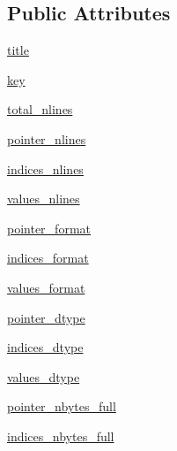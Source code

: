 \subsection*{Public Attributes}
\begin{DoxyCompactItemize}
\item 
\hyperlink{classscipy_1_1io_1_1harwell__boeing_1_1hb_1_1HBInfo_ac4aee9c85927ca22614e9a5fbab57615}{title}
\item 
\hyperlink{classscipy_1_1io_1_1harwell__boeing_1_1hb_1_1HBInfo_a5f0761b1508a3e658dfb482a5ecc8f2f}{key}
\item 
\hyperlink{classscipy_1_1io_1_1harwell__boeing_1_1hb_1_1HBInfo_a04af3e785630b81c4511e79d977cb64b}{total\+\_\+nlines}
\item 
\hyperlink{classscipy_1_1io_1_1harwell__boeing_1_1hb_1_1HBInfo_a64bdde52eda87746f758a6aaf87389a7}{pointer\+\_\+nlines}
\item 
\hyperlink{classscipy_1_1io_1_1harwell__boeing_1_1hb_1_1HBInfo_a315563a48cedcd5b796690ad426f170d}{indices\+\_\+nlines}
\item 
\hyperlink{classscipy_1_1io_1_1harwell__boeing_1_1hb_1_1HBInfo_af510f09accb2dedcf6c03a7ae16407fb}{values\+\_\+nlines}
\item 
\hyperlink{classscipy_1_1io_1_1harwell__boeing_1_1hb_1_1HBInfo_afc0d2a740477fc6a2dbd330000258288}{pointer\+\_\+format}
\item 
\hyperlink{classscipy_1_1io_1_1harwell__boeing_1_1hb_1_1HBInfo_a60781fff326c6c5068afd8fab54f2844}{indices\+\_\+format}
\item 
\hyperlink{classscipy_1_1io_1_1harwell__boeing_1_1hb_1_1HBInfo_af927e855970900010fcd6e66be384ae4}{values\+\_\+format}
\item 
\hyperlink{classscipy_1_1io_1_1harwell__boeing_1_1hb_1_1HBInfo_a36f03a15716a2150276ba465bdb7a25f}{pointer\+\_\+dtype}
\item 
\hyperlink{classscipy_1_1io_1_1harwell__boeing_1_1hb_1_1HBInfo_a897d3f6de5aff0cbd3d3c95617b22e18}{indices\+\_\+dtype}
\item 
\hyperlink{classscipy_1_1io_1_1harwell__boeing_1_1hb_1_1HBInfo_a5aadd021b2f509f7da207aff9bb05f95}{values\+\_\+dtype}
\item 
\hyperlink{classscipy_1_1io_1_1harwell__boeing_1_1hb_1_1HBInfo_a14a59013b38758ecdb7b35d0f167d144}{pointer\+\_\+nbytes\+\_\+full}
\item 
\hyperlink{classscipy_1_1io_1_1harwell__boeing_1_1hb_1_1HBInfo_aaa5ebe3dd552b5ab42512ae179ad14ab}{indices\+\_\+nbytes\+\_\+full}
\item 

\end{DoxyCompactItemize}
